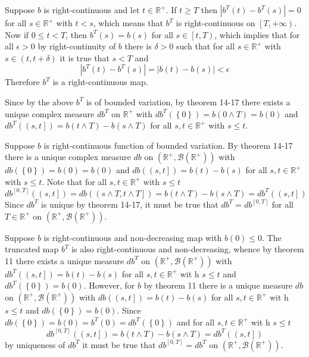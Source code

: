 \documentclass[a4paper]{article}
\newcommand{\obj}[1]{\left\{ #1 \right \}}
\newcommand{\clo}[1]{\left [ #1 \right ]}
\newcommand{\clop}[1]{\left [ #1 \right )}
\newcommand{\ploc}[1]{\left ( #1 \right ]}
\newcommand{\brac}[1]{\left ( #1 \right )}
\newcommand{\abs}[1]{\left | #1 \right |}
\newcommand{\Real}{\mathbb{R}}
\newcommand{\borel}[1]{\mathcal{B}\brac{#1}}
\begin{document}
Suppose $b$ is right-continuous and let $t\in \Real^+$. If $t\geq T$ then $\abs{b^T\brac{t}-b^T\brac{s}}=0$ for all $s\in \Real^+$ with $t<s$, which means that $b^T$ is right-continuous on $\clop{T,+\infty}$. Now if $0\leq t<T$, then $b^T\brac{s}=b\brac{s}$ for all $s\in \clop{t, T}$, which implies that for all $\epsilon>0$ by right-continuity of $b$ there is $\delta>0$ such that for all $s\in \Real^+$ with $s\in\brac{t,t+\delta}$ it is true that $s<T$ and \[\abs{b^T\brac{t}-b^T\brac{s}}=\abs{b\brac{t}-b\brac{s}}<\epsilon\] Therefore $b^T$ is a right-continuous map.

Since by the above $b^T$ is of bounded variation, by theorem 14-17 there exists a unique complex measure $db^T$ on $\Real^+$ with $db^T\brac{\obj{0}}=b\brac{0\wedge T}=b\brac{0}$ and $db^T\brac{\ploc{s,t}}=b\brac{t\wedge T}-b\brac{s\wedge T}$ for all $s,t\in \Real^+$ with $s\leq t$.

Suppose $b$ is right-continuous function of bounded variation. By theorem 14-17 there is a unique complex measure $db$ on $\brac{\Real^+, \borel{\Real^+}}$ with $db\brac{\obj{0}}=b\brac{0}=b\brac{0}$ and $db\brac{\ploc{s,t}}=b\brac{t}-b\brac{s}$ for all $s,t\in \Real^+$ with $s\leq t$. Note that for all $s,t\in \Real^+$ with $s\leq t$ \[db^{\clo{0,T}}\brac{\ploc{s,t}} = db\brac{\ploc{s\wedge T, t\wedge T}} = b\brac{t\wedge T}-b\brac{s\wedge T} = db^T\brac{\ploc{s,t}}\] Since $db^T$ is unique by theorem 14-17, it must be true that $db^T = db^{\clo{0,T}}$ for all $T\in \Real^+$ on $\brac{\Real^+, \borel{\Real^+}}$.

Suppose $b$ is right-continuous and non-decreasing map with $b\brac{0}\leq 0$. The truncated map $b^T$ is also right-continuous and non-decreasing, whence by theorem 11 there exists a unique measure $db^T$ on $\brac{\Real^+, \borel{\Real^+}}$ with $db^T\brac{\ploc{s,t}}=b\brac{t}-b\brac{s}$ for all $s,t\in \Real^+$ wit h $s\leq t$ and $db^T\brac{\obj{0}}=b\brac{0}$. However, for $b$ by theorem 11 there is a unique measure $db$ on $\brac{\Real^+, \borel{\Real^+}}$ with $db\brac{\ploc{s,t}}=b\brac{t}-b\brac{s}$ for all $s,t\in \Real^+$ wit h $s\leq t$ and $db\brac{\obj{0}}=b\brac{0}$. Since $db\brac{\obj{0}}=b\brac{0}=b^T\brac{0}=db^T\brac{\obj{0}}$ and for all $s,t\in \Real^+$ wit h $s\leq t$  \[db^{\clo{0,T}}\brac{\ploc{s,t}} = b\brac{t\wedge T}-b\brac{s\wedge T} = db^T\brac{\ploc{s,t}}\] by uniqueness of $db^T$ it must be true that $db^{\clo{0,T}}=db^T$ on $\brac{\Real^+, \borel{\Real^+}}$.\\
\end{document}
